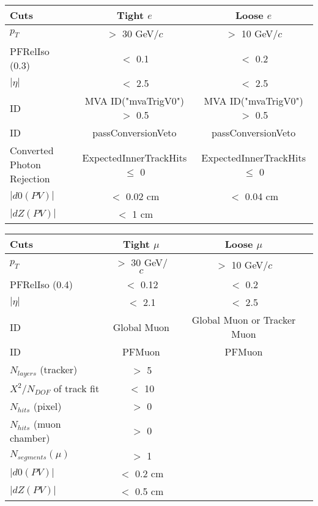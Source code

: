 \documentclass[landscape]{article}
\begin{document}
\begin{small}
  
  \begin{center}

    \begin{tabular}{ | l | c | c | }
      \hline \hline
      Cuts & Tight $e$ & Loose $e$ \\ \hline
      $p_{T}$ & $>$ 30 GeV/$c$ & $>$ 10 GeV/$c$ \\ \hline
      PFRelIso (0.3) & $<$ 0.1 & $<$ 0.2 \\ \hline
      $|\eta|$ & $<$ 2.5 & $<$ 2.5 \\ \hline
      ID & MVA ID("mvaTrigV0") $>$ 0.5 & MVA ID("mvaTrigV0") $>$ 0.5 \\ \hline
      ID & passConversionVeto & passConversionVeto \\ \hline
      Converted Photon Rejection & ExpectedInnerTrackHits $\leq$ 0 & ExpectedInnerTrackHits $\leq$ 0 \\ \hline
      $|d0(PV)|$ & $<$ 0.02 cm & $<$ 0.04 cm \\ \hline
      $|dZ(PV)|$ & $<$ 1 cm & \\
      \hline \hline
    \end{tabular}

    \vspace{10 mm}

    \begin{tabular}{ | l | c | c | }
      \hline \hline
      Cuts & Tight $\mu$ & Loose $\mu$ \\ \hline
      $p_{T}$ & $>$ 30 GeV/$c$ & $>$ 10 GeV/$c$ \\ \hline
      PFRelIso (0.4) & $<$ 0.12 & $<$ 0.2 \\ \hline
      $|\eta|$ & $<$ 2.1 & $<$ 2.5 \\ \hline
      ID & Global Muon & Global Muon or Tracker Muon \\ \hline
      ID & PFMuon & PFMuon \\ \hline
      $N_{layers}$ (tracker) & $>$ 5 & \\ \hline
      $X^{2} / N_{DOF}$ of track fit & $<$ 10 & \\ \hline
      $N_{hits}$ (pixel) & $>$ 0 & \\ \hline
      $N_{hits}$ (muon chamber) & $>$ 0 & \\ \hline
      $N_{segments}(\mu)$ & $>$ 1 & \\ \hline
      $|d0(PV)|$ & $<$ 0.2 cm & \\ \hline
      $|dZ(PV)|$ & $<$ 0.5 cm & \\
      \hline \hline
    \end{tabular}


\end{center}
\end{small}
\end{document}
